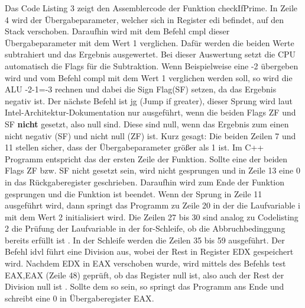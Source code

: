 \documentclass[12pt]{article}
\begin{document}
Das Code Listing 3 zeigt den Assemblercode der Funktion checkIfPrime. In Zeile 4 wird der Übergabeparameter, welcher sich in Register edi befindet, auf den Stack verschoben. Daraufhin wird mit dem Befehl cmpl dieser Übergabeparameter mit dem Wert 1 verglichen. Dafür werden die beiden Werte subtrahiert und das Ergebnis ausgewertet. Bei dieser Auswertung setzt die CPU automatisch die Flags für die Subtraktion. Wenn Beispielweise eine -2 übergeben wird und vom Befehl compl mit dem Wert 1 verglichen werden soll, so wird die ALU -2-1=-3 rechnen und dabei die Sign Flag(SF) setzen, da das Ergebnis negativ ist. Der nächste Befehl ist jg (Jump if greater), dieser Sprung wird laut Intel-Architektur-Dokumentation nur ausgeführt, wenn die beiden Flags ZF und SF \textbf{nicht} gesetzt, also null sind. Diese sind null, wenn das Ergebnis zum einen nicht negativ (SF) und nicht null (ZF) ist. \newline Kurz gesagt: Die beiden Zeilen 7 und 11 stellen sicher, dass der Übergabeparameter größer als 1 ist. Im C++ Programm entspricht das der ersten Zeile der Funktion. Sollte eine der beiden Flags ZF bzw. SF nicht gesetzt sein, wird nicht gesprungen und in Zeile 13 eine 0 in das Rückgaberegister geschrieben. Daraufhin wird zum Ende der Funktion gesprungen und die Funktion ist beendet. Wenn der Sprung in Zeile 11 ausgeführt wird, dann springt das Programm zu Zeile 20 in der die Laufvariable i  mit dem Wert 2 initialisiert wird. Die Zeilen 27 bis 30 sind analog zu Codelisting 2 die Prüfung der Laufvariable in der for-Schleife, ob die Abbruchbedinggung bereits erfüllt ist \cite{c}. In der Schleife werden die Zeilen 35 bis 59 ausgeführt. Der Befehl idvl führt eine Division aus, wobei der Rest in Register EDX gespeichert wird. Nachdem EDX in EAX verschoben wurde, wird mittels des Befehls test EAX,EAX (Zeile 48) geprüft, ob das Register null ist, also auch der Rest der Division null ist \cite{elements2005}. Sollte dem so sein, so springt das Programm ans Ende und schreibt eine 0 in Übergaberegister EAX\cite[S.202]{technischeInformatik2}.
\newpage

\listoffigures
\newpage
{}
\listoftables
\newpage
{}
\listofcodes
\newpage
{}

\end{document}
